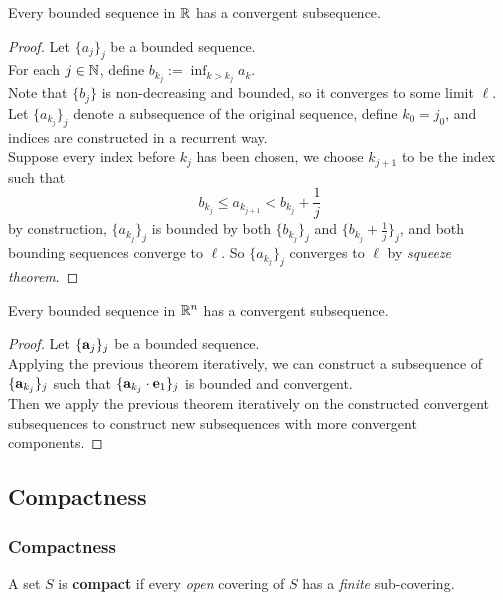 \documentclass[11pt]{article}
\newcommand{\vea}[0]{\ve{a}}
\begin{document}
		    \begin{theorem}
		    		Every bounded sequence in $\mathbb{R}$ has a convergent subsequence.
		    		\begin{proof}
		    			Let $\{a_j\}_j$ be a bounded sequence. \\
		    			For each $j \in \mathbb{N}$, define $b_{k_j} := \inf_{k > k_j} a_k$. \\
		    			Note that $\{b_j\}$ is non-decreasing and bounded, so it converges to some limit $\ell$. \\
		    			Let $\{a_{k_j}\}_j$ denote a subsequence of the original sequence, define $k_0 = j_0$, and indices are constructed in a recurrent way. \\
		    			Suppose every index before $k_j$ has been chosen, we choose $k_{j+1}$  to be the index such that 
		    			\begin{equation}
		    				b_{k_j} \leq a_{k_{j+1}} < b_{k_j} + \frac{1}{j}
		    			\end{equation}
		    			by construction, $\{a_{k_j}\}_j$ is bounded by both $\{b_{k_j}\}_j$ and $\{b_{k_j} + \frac{1}{j}\}_j$, and both bounding sequences converge to $\ell$. So $\{a_{k_j}\}_j$ converges to $\ell$ by \emph{squeeze theorem}.
		    		\end{proof}
		    \end{theorem}
		    
		    \begin{theorem}
		        Every bounded sequence in $\mathbb{R}^n$ has a convergent subsequence.
		        \begin{proof}
		        	Let $\{\vea_j\}_j$ be a bounded sequence. \\
		        	Applying the previous theorem iteratively, we can construct a subsequence of $\{\vea_{k_j}\}_j$ such that $\{\vea_{k_j} \cdot \ve{e}_1\}_{j}$ is bounded and convergent. \\
		        	Then we apply the previous theorem iteratively on the constructed convergent subsequences to construct new subsequences with more convergent components.
		        \end{proof}
		    \end{theorem}
		    
		\subsection{Compactness}
			\subsubsection{Compactness}
				\begin{definition}
					A set $S$ is \textbf{compact} if every \emph{open} covering of $S$ has a \emph{finite} sub-covering.
				\end{definition}
				
\end{document}
